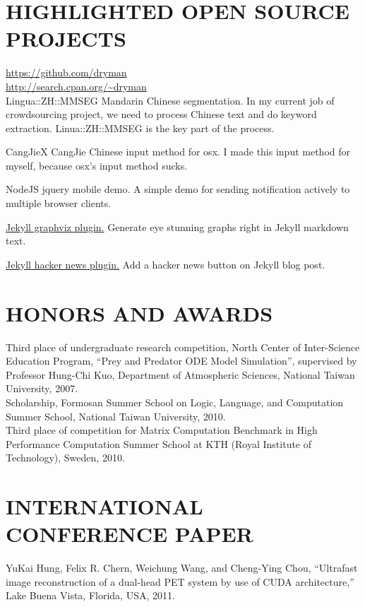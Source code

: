 \documentclass{res}
\begin{document}
\begin{resume}
\section{HIGHLIGHTED OPEN SOURCE PROJECTS}
  \url{https://github.com/dryman} \\
  \url{http://search.cpan.org/~dryman} \\


  Lingua::ZH::MMSEG Mandarin Chinese segmentation. In my current job of
  crowdsourcing project, we need to process Chinese text and do keyword
  extraction. Linua::ZH::MMSEG is the key part of the process. 

  CangJieX CangJie Chinese input method for osx. I made this input method for
  myself, because osx's input method sucks.

  NodeJS jquery mobile demo. A simple demo for sending notification actively to
  multiple browser clients.

  \href{http://www.idryman.org/blog/2012/04/04/jekyll-graphviz-plugin/} {Jekyll graphviz plugin.}
  Generate eye stunning graphs right in Jekyll markdown text.

  \href {http://www.idryman.org/blog/2012/04/05/jekyll-octopress-hacker-news-plugin/} {Jekyll hacker news plugin.}
  Add a hacker news button on Jekyll blog post.
 
 
\section{HONORS AND AWARDS}          
  Third place of undergraduate research competition, North Center of
  Inter-Science Education Program, ``Prey and Predator ODE Model Simulation'',
  supervised by Professor Hung-Chi Kuo, Department of Atmospheric Sciences,
  National Taiwan University, 2007. \\
  Scholarship, Formosan Summer School on Logic, Language, and Computation Summer
  School, National Taiwan University, 2010.\\
  Third place of competition for Matrix Computation Benchmark in High
  Performance Computation Summer School at KTH (Royal Institute of Technology),
  Sweden, 2010.\\

\section{INTERNATIONAL CONFERENCE PAPER}
  YuKai Hung, Felix R. Chern, Weichung Wang, and Cheng-Ying Chou, “Ultrafast
  image reconstruction of a dual-head PET system by use of CUDA architecture,”
  Lake Buena Vista, Florida, USA, 2011.
 

\end{resume}
\end{document}
